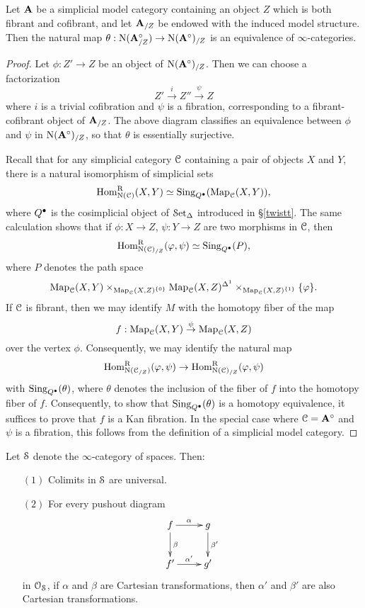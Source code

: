 \begin{lemma}\label{tulmand}
Let ${\mathbf A}$ be a simplicial model category containing an object $Z$ which is both fibrant and cofibrant, and let ${\mathbf A}_{/Z}$ be endowed with the induced model structure. Then
the natural map $\theta: \operatorname{N} ( {\mathbf A}_{/Z}^{\circ} ) \rightarrow \operatorname{N}({\mathbf A}^{\circ})_{/Z}$
is an equivalence of $\infty$-categories.
\end{lemma}

\begin{proof}
Let $\phi: Z' \rightarrow Z$ be an object of $\operatorname{N}({\mathbf A}^{\circ})_{/Z}$. Then we can choose a factorization
$$ Z' \stackrel{i}{\rightarrow} Z'' \stackrel{\psi}{\rightarrow} Z$$
where $i$ is a trivial cofibration and $\psi$ is a fibration, corresponding to a fibrant-cofibrant object
of ${\mathbf A}_{/Z}$. The above diagram classifies an equivalence between $\phi$ and $\psi$
in $\operatorname{N}({\mathbf A}^{\circ})_{/Z}$, so that $\theta$ is essentially surjective.

Recall that for any simplicial category $\operatorname{\mathcal{C}}$ containing a pair of objects $X$ and $Y$, there is a natural isomorphism of simplicial sets
$$ \operatorname{Hom}^{\operatorname{R}}_{\operatorname{N}(\operatorname{\mathcal{C}})}( X, Y ) \simeq \operatorname{Sing}_{Q^{\bullet}}( \operatorname{{Map}}_{\operatorname{\mathcal{C}}}(X,Y) ),$$ 
where $Q^{\bullet}$ is the cosimplicial object of $\operatorname{\mathcal{S}et_{\Delta}}$ introduced in \S \ref{twistt}. The same calculation shows that if $\phi: X \rightarrow Z$, $\psi: Y \rightarrow Z$ are two morphisms
in $\operatorname{\mathcal{C}}$, then
$$ \operatorname{Hom}^{\operatorname{R}}_{ \operatorname{N}(\operatorname{\mathcal{C}})_{/Z} }(\varphi, \psi) \simeq \operatorname{Sing}_{Q^{\bullet}}(P),$$
where $P$ denotes the path space 
$$ \operatorname{{Map}}_{\operatorname{\mathcal{C}}}(X,Y) \times_{ \operatorname{{Map}}_{\operatorname{\mathcal{C}}}(X,Z)^{ \{0\} } }
\operatorname{{Map}}_{\operatorname{\mathcal{C}}}(X,Z)^{\Delta^1} \times_{ \operatorname{{Map}}_{\operatorname{\mathcal{C}}}(X,Z)^{ \{1\} }} \{ \varphi \}.$$
If $\operatorname{\mathcal{C}}$ is fibrant, then we may identify $M$ with the homotopy fiber of the map
$$ f: \operatorname{{Map}}_{\operatorname{\mathcal{C}}}(X,Y) \stackrel{\psi}{\rightarrow} \operatorname{{Map}}_{\operatorname{\mathcal{C}}}(X,Z)$$
over the vertex $\phi$. Consequently, we may identify the natural map
$$ \operatorname{Hom}^{\operatorname{R}}_{ \operatorname{N}( \operatorname{\mathcal{C}}_{/Z} )}(\varphi, \psi) \rightarrow
\operatorname{Hom}^{\operatorname{R}}_{ \operatorname{N}(\operatorname{\mathcal{C}})_{/Z} }(\varphi, \psi)$$
with $\operatorname{Sing}_{Q^{\bullet}}( \theta)$, where $\theta$ denotes the inclusion of
the fiber of $f$ into the homotopy fiber of $f$. Consequently, to show that
$\operatorname{Sing}_{Q^{\bullet}}(\theta)$ is a homotopy equivalence, it suffices to prove that
$f$ is a Kan fibration. In the special case where $\operatorname{\mathcal{C}} = {\mathbf A}^{\circ}$ and
$\psi$ is a fibration, this follows from the definition of a simplicial model category.
\end{proof}

\begin{lemma}\label{sugartime}
Let $\operatorname{\mathcal{S}}$ denote the $\infty$-category of spaces. Then:
\begin{itemize}
\item[$(1)$] Colimits in $\operatorname{\mathcal{S}}$ are universal.
\item[$(2)$] For every pushout diagram $$ \xymatrix{ f \ar[r]^{\alpha} \ar[d]^{\beta} & g \ar[d]^{\beta'} \\
f' \ar[r]^{\alpha'} & g' }$$
in $\operatorname{\mathcal{O}}_{\operatorname{\mathcal{S}}}$, if $\alpha$ and $\beta$ are Cartesian transformations, then
$\alpha'$ and $\beta'$ are also Cartesian transformations.
\end{itemize}
\end{lemma}

